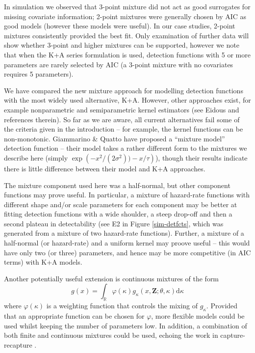 \documentclass[10pt]{article}
\begin{document}
In simulation we observed that 3-point mixture did not act as good surrogates for missing covariate information; 2-point mixtures were generally chosen by AIC as good models (however these models were useful). In our case studies, 2-point mixtures consistently provided the best fit. Only examination of further data will show whether 3-point and higher mixtures can be supported, however we note that when the K+A series formulation is used, detection functions with 5 or more parameters are rarely selected by AIC (a 3-point mixture with no covariates requires 5 parameters).

We have compared the new mixture approach for modelling detection functions with the most widely used alternative, K+A. However, other approaches exist, for example nonparametric and semiparametric kernel estimators (see Eidous \cite{Eidous:2011} and references therein).  So far as we are aware, all current alternatives fail some of the criteria given in the introduction -- for example, the kernel functions can be non-monotonic. Giammarino \& Quatto \cite{Giammarino:2014eg} have proposed a ``mixture model'' detection function -- their model takes a rather different form to the mixtures we describe here (simply $\exp\left( -x^2/(2\sigma^2)) - x/\tau\right)$), though their results indicate there is little difference between their model and K+A approaches.

The mixture component used here was a half-normal, but other component functions may prove useful.  In particular, a mixture of hazard-rate functions with different shape and/or scale parameters for each component may be better at fitting detection functions with a wide shoulder, a steep drop-off and then a second plateau in detectability (see E2 in Figure \ref{sim-detfcts}, which was generated from a mixture of two hazard-rate functions).  Further, a mixture of a half-normal (or hazard-rate) and a uniform kernel may proove useful -- this would have only two (or three) parameters, and hence may be more competitive (in AIC terms) with K+A models.

Another potentially useful extension is continuous mixtures of the form
\begin{equation*}
g(x) = \int_\mathbb{R} \varphi(\kappa) g_\kappa(x,\mathbf{Z}; \theta, \kappa) \text{d}\kappa
\end{equation*}
where $\varphi(\kappa)$ is a weighting function that controls the mixing of $g_\kappa$. Provided that an appropriate function can be chosen for $\varphi$, more flexible models could be used whilst keeping the number of parameters low. In addition, a combination of both finite and continuous mixtures could be used, echoing the work in capture-recapture \cite{Morgan:2008wy}.
\end{document}
